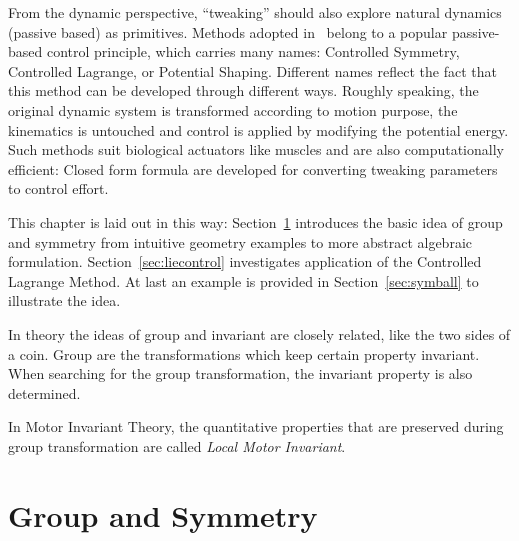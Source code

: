 From the dynamic perspective, ``tweaking''  should also explore natural dynamics (passive based) as primitives.
Methods adopted in \moit\ belong to  a popular passive-based control principle, which carries many names: Controlled Symmetry, Controlled Lagrange, or Potential Shaping.
Different names reflect the fact that this method can be developed through different ways.
Roughly speaking, the original dynamic system is transformed according to motion purpose, the kinematics is untouched and control is applied by modifying the potential energy.
Such methods suit biological actuators like muscles and are also computationally efficient:
Closed form formula are developed for converting tweaking parameters to control effort.

This chapter is laid out in this way:
Section~\ref{sec:groupandsymmetry} introduces the basic idea of group and symmetry from intuitive geometry examples to more abstract algebraic formulation. Section~\ref{sec:liecontrol} investigates application of the Controlled Lagrange Method.
At last an example is provided in Section~\ref{sec:symball} to illustrate the idea.

In theory the ideas of group and invariant are closely related, like the two sides of a coin.
Group are the transformations which keep certain property invariant.
When searching for the group transformation, the invariant property is also determined.

In Motor Invariant Theory, the quantitative properties that are  preserved during group transformation are called \emph{Local Motor Invariant}.







\section{Group and Symmetry}
\label{sec:groupandsymmetry}
%
%



